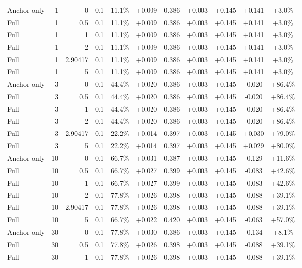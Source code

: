 \begin{table}[htbp]
\begin{tabular}{lrrrccccccc}
Anchor only & 1 & 0 & 0.1 & 11.1\% & +0.009 & 0.386 & +0.003 & +0.145 & +0.141 & +3.0\% \\
Full & 1 & 0.5 & 0.1 & 11.1\% & +0.009 & 0.386 & +0.003 & +0.145 & +0.141 & +3.0\% \\
Full & 1 & 1 & 0.1 & 11.1\% & +0.009 & 0.386 & +0.003 & +0.145 & +0.141 & +3.0\% \\
Full & 1 & 2 & 0.1 & 11.1\% & +0.009 & 0.386 & +0.003 & +0.145 & +0.141 & +3.0\% \\
Full & 1 & 2.90417 & 0.1 & 11.1\% & +0.009 & 0.386 & +0.003 & +0.145 & +0.141 & +3.0\% \\
Full & 1 & 5 & 0.1 & 11.1\% & +0.009 & 0.386 & +0.003 & +0.145 & +0.141 & +3.0\% \\
Anchor only & 3 & 0 & 0.1 & 44.4\% & +0.020 & 0.386 & +0.003 & +0.145 & -0.020 & +86.4\% \\
Full & 3 & 0.5 & 0.1 & 44.4\% & +0.020 & 0.386 & +0.003 & +0.145 & -0.020 & +86.4\% \\
Full & 3 & 1 & 0.1 & 44.4\% & +0.020 & 0.386 & +0.003 & +0.145 & -0.020 & +86.4\% \\
Full & 3 & 2 & 0.1 & 44.4\% & +0.020 & 0.386 & +0.003 & +0.145 & -0.020 & +86.4\% \\
Full & 3 & 2.90417 & 0.1 & 22.2\% & +0.014 & 0.397 & +0.003 & +0.145 & +0.030 & +79.0\% \\
Full & 3 & 5 & 0.1 & 22.2\% & +0.014 & 0.397 & +0.003 & +0.145 & +0.029 & +80.0\% \\
Anchor only & 10 & 0 & 0.1 & 66.7\% & +0.031 & 0.387 & +0.003 & +0.145 & -0.129 & +11.6\% \\
Full & 10 & 0.5 & 0.1 & 66.7\% & +0.027 & 0.399 & +0.003 & +0.145 & -0.083 & +42.6\% \\
Full & 10 & 1 & 0.1 & 66.7\% & +0.027 & 0.399 & +0.003 & +0.145 & -0.083 & +42.6\% \\
Full & 10 & 2 & 0.1 & 77.8\% & +0.026 & 0.398 & +0.003 & +0.145 & -0.088 & +39.1\% \\
Full & 10 & 2.90417 & 0.1 & 77.8\% & +0.026 & 0.398 & +0.003 & +0.145 & -0.088 & +39.1\% \\
Full & 10 & 5 & 0.1 & 66.7\% & +0.022 & 0.420 & +0.003 & +0.145 & -0.063 & +57.0\% \\
Anchor only & 30 & 0 & 0.1 & 77.8\% & +0.030 & 0.386 & +0.003 & +0.145 & -0.134 & +8.1\% \\
Full & 30 & 0.5 & 0.1 & 77.8\% & +0.026 & 0.398 & +0.003 & +0.145 & -0.088 & +39.1\% \\
Full & 30 & 1 & 0.1 & 77.8\% & +0.026 & 0.398 & +0.003 & +0.145 & -0.088 & +39.1\% \\

\end{tabular}
\end{table}
